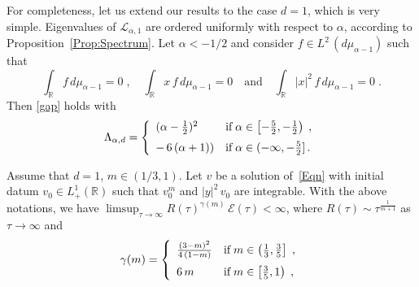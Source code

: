 \medskip
For completeness, let us extend our results to the case $d=1$, which is very simple. Eigenvalues of $\mathcal L_{\alpha,1}$ are ordered uniformly
with respect to $\alpha$, according to Proposition~\ref{Prop:Spectrum}. Let $\alpha<-1/2$ and consider $f\in L^2\,(d\mu_{\alpha-1})$ such that
\[
\int_{{\mathbb R}} f\,d\mu_{\alpha-1}=0\;,\quad\int_{{\mathbb R}} x\,f\,d\mu_{\alpha-1}=0\quad\mbox{and}\quad\int_{{\mathbb R}} |x|^2\,f\,d\mu_{\alpha-1}=0\;.
\]
Then \eqref{gap} holds with
\[
\Lambda_{\alpha,d}=\left\{\begin{array}{ll}
(\alpha-\tfrac 12)^2&\mbox{if}\;\alpha\in\left[-\tfrac 52,-\tfrac 12\right)\;,\vspace{6pt}\cr
-\,6\,(\alpha+1))&\mbox{if}\;\alpha\in(-\infty,-\tfrac 52]\,.
\end{array}\right.
\]

\begin{theorem}\label{Thm:MainOneD} Assume that $d=1$, $m\in(1/3,1)$.
Let $v$ be a solution of~\eqref{Eqn} with initial datum $v_0\in L^1_+({{\mathbb R}})$ such that $v_0^m$ and $|y|^2\,v_0$ are integrable. With the above
notations, we have $\limsup_{\tau\to\infty}R(\tau)^{\gamma(m)}\,\mathcal E(\tau)<\infty$, where $R(\tau)\sim\tau^{\frac 1{m+1}}$ as
$\tau\to\infty$ and
\[
\gamma(m)=\left\{\begin{array}{ll}
\frac{(3-m)^2}{4\,(1-m)}&\mbox{if}\;m\in\left(\tfrac 13,\tfrac 35\right]\;,\vspace{6pt}\cr
6\,m&\mbox{if}\;m\in\left[\tfrac 35,1\right)\;,\cr
\end{array}\right.
\]
\end{theorem}

\bigskip{}

\par{}


